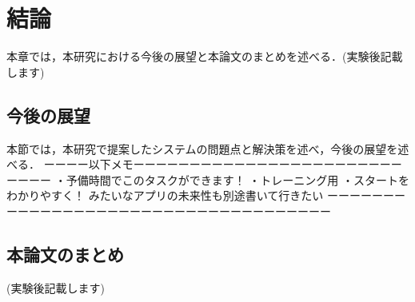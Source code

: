 \chapter{結論}
本章では，本研究における今後の展望と本論文のまとめを述べる．(実験後記載します)

\section{今後の展望}
本節では，本研究で提案したシステムの問題点と解決策を述べ，今後の展望を述べる．
ーーーー以下メモーーーーーーーーーーーーーーーーーーーーーーーーーーーー
・予備時間でこのタスクができます！
・トレーニング用
・スタートをわかりやすく！ みたいなアプリの未来性も別途書いて行きたい
ーーーーーーーーーーーーーーーーーーーーーーーーーーーーーーーーーーーー
\section{本論文のまとめ}
(実験後記載します)